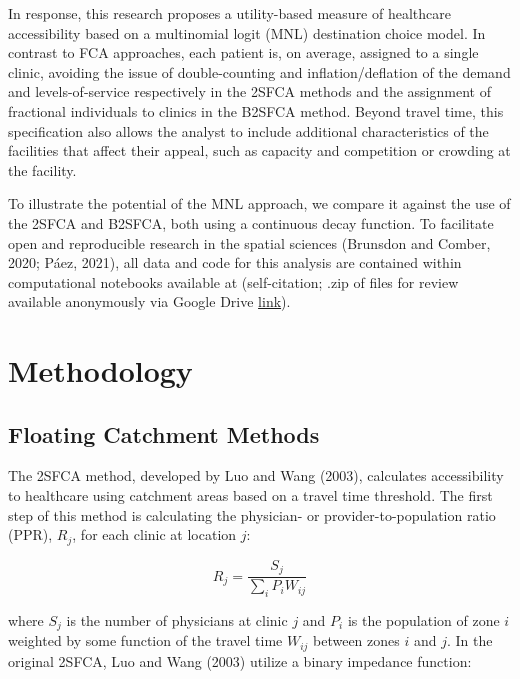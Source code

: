 \documentclass[]{elsarticle} %
\begin{document}
In response, this research proposes a utility-based measure of
healthcare accessibility based on a multinomial logit (MNL) destination
choice model. In contrast to FCA approaches, each patient is, on
average, assigned to a single clinic, avoiding the issue of
double-counting and inflation/deflation of the demand and
levels-of-service respectively in the 2SFCA methods and the assignment
of fractional individuals to clinics in the B2SFCA method. Beyond travel
time, this specification also allows the analyst to include additional
characteristics of the facilities that affect their appeal, such as
capacity and competition or crowding at the facility.

To illustrate the potential of the MNL approach, we compare it against
the use of the 2SFCA and B2SFCA, both using a continuous decay function.
To facilitate open and reproducible research in the spatial sciences
(Brunsdon and Comber, 2020; Páez, 2021), all data and code for this
analysis are contained within computational notebooks available at
(self-citation; .zip of files for review available anonymously via
Google Drive
\href{https://drive.google.com/file/d/1d66npiqIrawCU8DgNrYcztRJef80f7pd/view?usp=sharing}{link}).

\hypertarget{methodology}{%
\section{Methodology}\label{methodology}}

\hypertarget{floating-catchment-methods}{%
\subsection{Floating Catchment
Methods}\label{floating-catchment-methods}}

The 2SFCA method, developed by Luo and Wang (2003), calculates
accessibility to healthcare using catchment areas based on a travel time
threshold. The first step of this method is calculating the physician-
or provider-to-population ratio (PPR), \(R_j\), for each clinic at
location \(j\):

\begin{equation}
\label{eq:fca_rj}
R_j = \frac{S_j}{\sum_i{P_iW_{ij}}}
\end{equation}

\noindent where \(S_j\) is the number of physicians at clinic \(j\) and
\(P_i\) is the population of zone \(i\) weighted by some function of the
travel time \(W_{ij}\) between zones \(i\) and \(j\). In the original
2SFCA, Luo and Wang (2003) utilize a binary impedance function:
\end{document}
